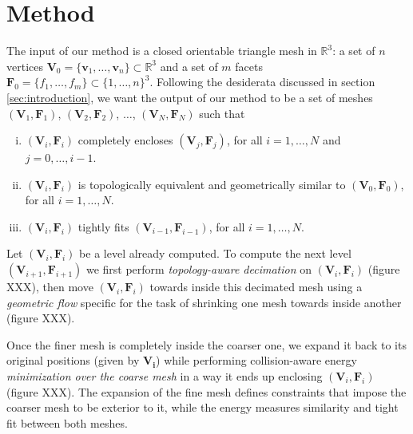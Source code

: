 \section{Method}
\label{sec:method}

The input of our method is a closed orientable triangle mesh in $\mathbb{R}^3$:
a set of $n$ vertices $\mathbf{V}_0= \{ \mathbf{v}_1, \ldots, \mathbf{v}_n \}
\subset \mathbb{R}^3$ and a set of $m$ facets $\mathbf{F}_0 = \{ f_1, \ldots,
f_m \} \subset \{ 1, \ldots, n \}^3$.  Following the desiderata discussed in
section \ref{sec:introduction}, we want the output of our method to be a set of
meshes $(\mathbf{V}_1,\mathbf{F}_1)$,  $(\mathbf{V}_2,\mathbf{F}_2)$, $\ldots$,
$(\mathbf{V}_N,\mathbf{F}_N)$ such that 

\begin{enumerate}[(i)]
\item $(\mathbf{V}_{i},\mathbf{F}_{i})$ completely encloses
$(\mathbf{V}_j,\mathbf{F}_j)$, for all $i = 1, \ldots, N$ and $j = 0, \ldots,
i-1$.
\item $(\mathbf{V}_{i},\mathbf{F}_{i})$ is topologically equivalent and
geometrically similar to $(\mathbf{V}_{0},\mathbf{F}_{0})$, for all $i = 1,
\ldots, N$.
\item $(\mathbf{V}_{i},\mathbf{F}_{i})$ tightly fits
$(\mathbf{V}_{i-1},\mathbf{F}_{i-1})$, for all $i = 1, \ldots, N$.
\end{enumerate}

Let $(\mathbf{V}_i,\mathbf{F}_i)$ be a level already computed. To compute the
next level $(\mathbf{V}_{i+1},\mathbf{F}_{i+1})$ we first perform
\emph{topology-aware decimation} on $(\mathbf{V}_i,\mathbf{F}_i)$ (figure XXX),
then move $(\mathbf{V}_i,\mathbf{F}_i)$ towards inside this decimated mesh
using a \emph{geometric flow} specific for the task of shrinking one mesh
towards inside another (figure XXX). 

Once the finer mesh is completely inside the coarser one, we expand it back to
its original positions (given by $\mathbf{V_i}$) while performing
collision-aware energy \emph{minimization over the coarse mesh} in a way it
ends up enclosing $(\mathbf{V}_i,\mathbf{F}_i)$ (figure XXX). The expansion of
the fine mesh defines constraints that impose the coarser mesh to be exterior
to it, while the energy measures similarity and tight fit between both meshes.

